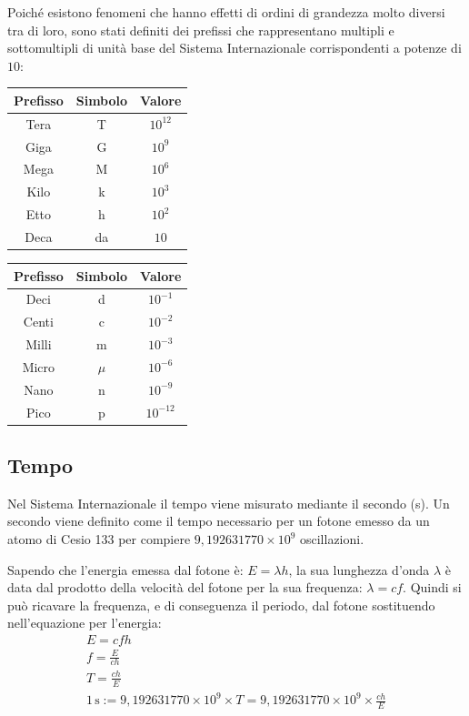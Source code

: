 \documentclass{article}
\numberwithin{equation}{subsection}
\begin{document}
Poiché esistono fenomeni che hanno effetti di ordini di grandezza molto diversi tra di loro, sono stati definiti dei prefissi che rappresentano multipli e sottomultipli di 
unità base del Sistema Internazionale corrispondenti a potenze di $10$:
\begin{center}
    \begin{tabular}{|c|c|c|}
        \hline
        Prefisso & Simbolo & Valore\\
        \hline
        Tera & T & $10^{12}$\\
        \hline
        Giga & G &$10^{9}$\\
        \hline
        Mega & M &$10^6$\\
        \hline
        Kilo & k & $10^3$\\
        \hline
        Etto & h & $10^2$\\
        \hline
        Deca & da & $10$\\
        \hline
    \end{tabular}
    \begin{tabular}{|c|c|c|}
        \hline
        Prefisso & Simbolo & Valore\\
        \hline
        Deci & d & $10^{-1}$\\
        \hline
        Centi & c &$10^{-2}$\\
        \hline
        Milli & m &$10^{-3}$\\
        \hline
        Micro &  $\mu$ & $10^{-6}$\\
        \hline
        Nano & n & $10^{-9}$\\
        \hline
        Pico & p & $10^{-12}$\\
        \hline
    \end{tabular}
\end{center}

\subsection{Tempo}

Nel Sistema Internazionale il tempo viene misurato mediante 
il secondo (s).
Un secondo viene definito come il tempo necessario per un 
fotone emesso da un atomo di Cesio 133 per compiere 
$9{,}192631770\times 10^9$ oscillazioni.



Sapendo che l'energia emessa dal fotone è: 
$E= \lambda h$, la sua lunghezza 
d'onda $\lambda$ è data dal prodotto della velocità del fotone 
per la sua frequenza: $\lambda  = cf$.
Quindi si può ricavare la frequenza, e di conseguenza il 
periodo, dal fotone sostituendo nell'equazione per l'energia: 
\begin{gather*}
    E = cfh\\
    f = \displaystyle\frac{E}{ch}\\
    T = \displaystyle\frac{ch}{E}\\
    1\,\mathrm{s} := 9{,}192631770\times 10^9 \times T = 9{,}192631770\times 10^9 \times \displaystyle\frac{ch}{E}
\end{gather*}
\end{document}
